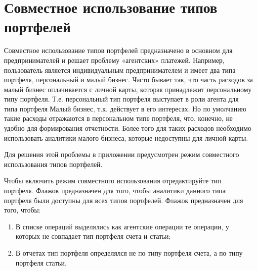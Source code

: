 \documentclass[a4paper,10pt,russian]{sphinxmanual}
\begin{document}
\noindent{}
\noindent{}
\noindent{}
\noindent{}


\chapter{Совместное использование типов портфелей}
\label{\detokenize{shared-transactions:chapter-shared-transactions}}\label{\detokenize{shared-transactions:id1}}\label{\detokenize{shared-transactions::doc}}
Совместное использование типов портфелей предназначено в основном для предпринимателей
и решает проблему «агентских» платежей. Например, пользователь является
индивидуальным предпринимателем и имеет два типа портфеля, персональный и малый бизнес.
Часто бывает так, что часть расходов за малый бизнес оплачивается с личной
карты, которая принадлежит персональному типу портфеля. Т.е. персональный тип портфеля
выступает в роли агента для типа портфеля Малый бизнес, т.к. действует в его интересах.
Но по умолчанию такие расходы отражаются в персональном типе портфеля, что, конечно,
не удобно для формирования отчетности. Более того для таких расходов необходимо
использовать аналитики малого бизнеса, которые недоступны для личной карты.

Для решения этой проблемы в приложении предусмотрен режим совместного использования типов
портфелей.

Чтобы включить режим совместного использования отредактируйте тип портфеля.
Флажок  предназначен для того, чтобы аналитики данного типа портфеля
были доступны для всех типов портфелей.
Флажок  предназначен для того, чтобы:
\begin{enumerate}
\def\theenumi{\arabic{enumi}}
\def\labelenumi{\theenumi .}
\makeatletter\def\p@enumii{\p@enumi \theenumi .}\makeatother
\item {} 
В списке операций выделялись как агентские операции те операции, у которых не совпадает тип портфеля счета и статьи;

\item {} 
В отчетах тип портфеля определялся не по типу портфеля счета, а по типу портфеля статьи.

\end{enumerate}
\end{document}

